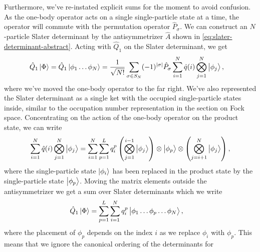         Furthermore, we've re-instated explicit sums for the moment to avoid
        confusion.
        As the one-body operator acts on a single single-particle state at a
        time, the operator will commute with the permutation operator
        $\hat{P}_{\sigma}$.
        We can construct an $N$-particle Slater determinant by the
        antisymmetrizer $\hat{A}$ shown in
        \autoref{eq:slater-determinant-abstract}.
        Acting with $\hat{Q}_1$ on the Slater determinant, we get
        \begin{align}
            \hat{Q}_1\ket{\Phi}
            &=
            \hat{Q}_1\ket{\phi_1\dots\phi_N}
            =
            \frac{1}{\sqrt{N!}}
            \sum_{\sigma \in S_N}
            (-1)^{\abs{\sigma}}
            \hat{P}_{\sigma}
            \sum_{i = 1}^{N}\hat{q}(i)
            \bigotimes_{j = 1}^{N}
            \ket{\phi_j},
        \end{align}
        where we've moved the one-body operator to the far right.
        We've also represented the Slater determinant as a single ket with the
        occupied single-particle states inside, similar to the occupation number
        representation in the section on Fock space.
        Concentrating on the action of the one-body operator on the product
        state, we can write
        \begin{align}
            \sum_{i = 1}^{N}\hat{q}(i)
            \bigotimes_{j = 1}^{N}
            \ket{\phi_j}
            =
            \sum_{i = 1}^{N}
            \sum_{p = 1}^{L}
            q^{p}_{i}
            \left( 
                \bigotimes_{j = 1}^{i - 1}
                \ket{\phi_j}
             \right)
            \otimes \ket{\phi_p}
            \otimes \left( 
                \bigotimes_{j = i + 1}^{N}
                \ket{\phi_j}
             \right),
        \end{align}
        where the single-particle state $\ket{\phi_i}$ has been replaced in the
        product state by the single-particle state $\ket{\phi_p}$.
        Moving the matrix elements outside the antisymmetrizer we get a sum over
        Slater determinants which we write
        \begin{align}
            \hat{Q}_1\ket{\Phi}
            &=
            \sum_{p = 1}^{L}
            \sum_{i = 1}^{N}q^{p}_{i}
            \ket{\phi_1\dots\phi_p\dots\phi_N},
        \end{align}
        where the placement of $\phi_p$ depends on the index $i$ as we replace
        $\phi_i$ with $\phi_p$.
        This means that we ignore the canonical ordering of the determinants for
